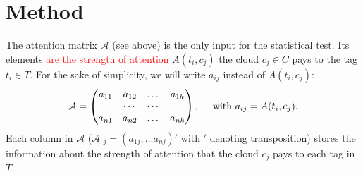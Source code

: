 \documentclass{llncs}
\begin{document}





%
\section{Method}
The attention matrix $\mathcal{A}$ (see above) is the only input for the statistical test. Its elements \textcolor{red}{are the strength of attention} $A(t_i, c_j)$ the cloud $c_j \in C$
 pays to the tag $t_i \in T$. For the sake of simplicity, we will write $a_{ij}$ instead of $A(t_i, c_j)$:
\[
\mathcal{A} = \begin{pmatrix}
a_{11} & a_{12} & \dots & a_{1k} \\
       &\cdots & \cdots &  \\
a_{n1} & a_{n2} & \dots & a_{nk}
\end{pmatrix}, 
\quad ~\text{with}~a_{ij} = A(t_i, c_j).
\]
Each column in $\mathcal{A}$ ($\mathcal{A}_{:j} =(a_{1j}, \dots a_{nj})'$ with $'$ denoting transposition)  stores the information about the strength of attention that the cloud $c_j$ pays to each tag in $T$. 
\end{document}
